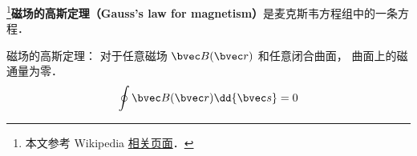 
\begin{issues}
\issueDraft
\end{issues}


\footnote{本文参考 Wikipedia \href{https://en.wikipedia.org/wiki/Gauss's_law_for_magnetism}{相关页面}．}\textbf{磁场的高斯定理（Gauss's law for magnetism）}是麦克斯韦方程组中的一条方程．

磁场的高斯定理： 对于任意磁场 $\bvec B(\bvec r)$ 和任意闭合曲面， 曲面上的磁通量为零．
\begin{equation}
\oint \bvec B(\bvec r) \dd{\bvec s} = 0
\end{equation}
